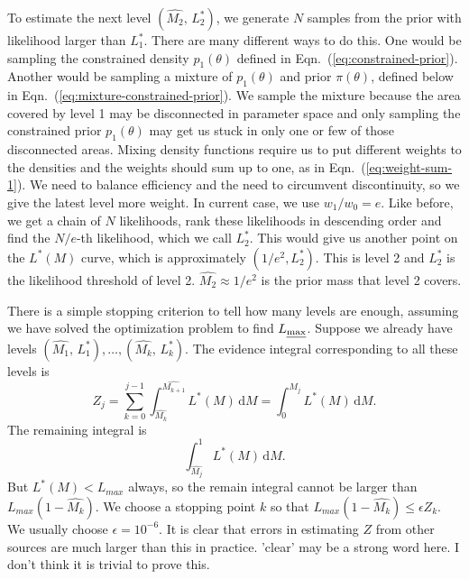 \documentclass[letterpaper, preprint]{aastex}
\newcommand{\qer}[1]{{\color{red}#1}}
\begin{document}
To estimate the next level $\left(\widehat{M_2}, \,L^*_2\right)$, we generate $N$ samples from the prior with likelihood larger than $L^*_1$. There are many different ways to do this. One would be sampling the constrained density $p_{1}(\theta)$ defined in Eqn.~(\ref{eq:constrained-prior}). Another would be sampling a mixture of $p_{1}(\theta)$ and prior $\pi(\theta)$, defined below in Eqn.~(\ref{eq:mixture-constrained-prior}). We sample the mixture because the area covered by level 1 may be disconnected in parameter space and only sampling the constrained prior $p_{1}(\theta)$ may get us stuck in only one or few of those disconnected areas. Mixing density functions require us to put different weights to the densities and the weights should sum up to one, as in Eqn.~(\ref{eq:weight-sum-1}). We need to balance efficiency and the need to circumvent discontinuity, so we give the latest level more weight. In current case, we use $w_1/w_0=e$. Like before, we get a chain of $N$ likelihoods, rank these likelihoods in descending order and find the $N/e$-th likelihood, which we call $L_2^*$. This would give us another point on the $L^*(M)$ curve, which is approximately $(1/e^2,L_2^*)$. This is level 2 and $L_2^*$ is the likelihood threshold of level 2. $\widehat{M_2}\approx1/e^2$ is the prior mass that level 2 covers. 

There is a simple stopping criterion to tell how many levels are enough, assuming we have solved the optimization problem to find $L_{\mbox{\scriptsize \em max}}$. Suppose we already have levels $\left(\widehat{M_1},\,L^*_1\right), \ldots, \left(\widehat{M_k},\,L^*_k\right)$. The evidence integral corresponding to all these levels is 
$$
Z_j= \sum_{k=0}^{j-1} \int_{\widehat{M_k}}^{\widehat{M_{k+1}}} L^*(M)\,\mathrm{d}M 
= \int_0^{\widehat{M_{j}}} L^*(M)\,\mathrm{d}M .
$$
The remaining integral is
$$
\int_{\widehat{M_j}}^1 L^*(M)\,\mathrm{d}M.
$$
But $L^*(M) < L_{max}$ always, so the remain integral cannot be larger than $L_{max}(1-\widehat{M_k})$. We choose a stopping point $k$ so that $L_{max}(1-\widehat{M_k}) \leq \epsilon Z_k$. We usually choose $\epsilon = 10^{-6}$. It is clear that errors in estimating $Z$ from other sources are much larger than this in practice. \qer{'clear' may be a strong word here. I don't think it is trivial to prove this.}
\end{document}
